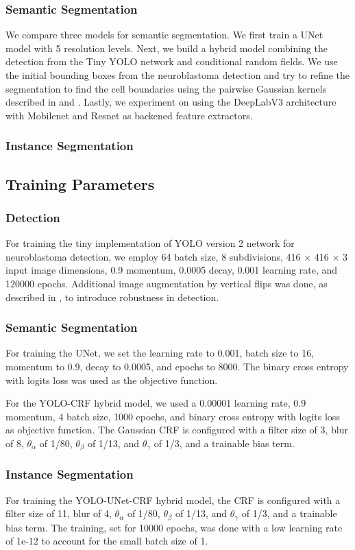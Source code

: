 \documentclass[journal]{IEEEtran}
\begin{document}
\subsubsection{Semantic Segmentation}
We compare three models for semantic segmentation. We first train a UNet model with 5 resolution levels. Next, we build a hybrid model combining the detection from the Tiny YOLO network and conditional random fields. We use the initial bounding boxes from the neuroblastoma detection and try to refine the segmentation to find the cell boundaries using the pairwise Gaussian kernels described in \cite{NIPS2011_4296} and \cite{Teichmann2018ConvolutionalCF}. Lastly, we experiment on using the DeepLabV3 architecture with Mobilenet and Resnet as backened feature extractors.
\subsubsection{Instance Segmentation}
\subsection{Training Parameters}
\subsubsection{Detection}
For training the tiny implementation of YOLO version 2 network for neuroblastoma detection, we employ 64 batch size, 8 subdivisions, 416 $\times$ 416 $\times$ 3 input image dimensions, 0.9 momentum, 0.0005 decay, 0.001 learning rate, and 120000 epochs. Additional image augmentation by vertical flips was done, as described in \cite{Waithe544833}, to introduce robustness in detection.
\subsubsection{Semantic Segmentation}
For training the UNet, we set the learning rate to 0.001, batch size to 16, momentum to 0.9, decay to 0.0005, and epochs to 8000. The binary cross entropy with logits loss was used as the objective function.

For the YOLO-CRF hybrid model, we used a 0.00001 learning rate, 0.9 momentum, 4 batch size, 1000 epochs, and binary cross entropy with logits loss as objective function. The Gaussian CRF is configured with a filter size of 3, blur of 8, $\theta_\alpha$ of 1/80, $\theta_\beta$ of 1/13, and $\theta_\gamma$ of 1/3, and a trainable bias term.
\subsubsection{Instance Segmentation}
For training the YOLO-UNet-CRF hybrid model, the CRF is configured with a filter size of 11, blur of 4, $\theta_\alpha$ of 1/80, $\theta_\beta$ of 1/13, and $\theta_\gamma$ of 1/3, and a trainable bias term. The training, set for 10000 epochs, was done with a low learning rate of 1e-12 to account for the small batch size of 1. 
\end{document}

